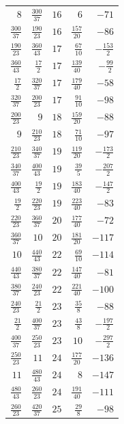 {\begin{longtable}{@{\extracolsep{\fill}}rrrrr}
$8$ & $\frac{300}{37}$ & $16$ & $6$ & $-71$ \\
$\frac{300}{37}$ & $\frac{190}{23}$ & $16$ & $\frac{157}{20}$ & $-86$ \\
$\frac{190}{23}$ & $\frac{360}{43}$ & $17$ & $\frac{67}{10}$ & $-\frac{153}{2}$ \\
$\frac{360}{43}$ & $\frac{17}{2}$ & $17$ & $\frac{139}{40}$ & $-\frac{99}{2}$ \\
$\frac{17}{2}$ & $\frac{320}{37}$ & $17$ & $\frac{179}{40}$ & $-58$ \\
$\frac{320}{37}$ & $\frac{200}{23}$ & $17$ & $\frac{91}{10}$ & $-98$ \\
$\frac{200}{23}$ & $9$ & $18$ & $\frac{159}{20}$ & $-88$ \\
$9$ & $\frac{210}{23}$ & $18$ & $\frac{71}{10}$ & $-97$ \\
$\frac{210}{23}$ & $\frac{340}{37}$ & $19$ & $\frac{119}{20}$ & $-\frac{173}{2}$ \\
$\frac{340}{37}$ & $\frac{400}{43}$ & $19$ & $\frac{39}{5}$ & $-\frac{207}{2}$ \\
$\frac{400}{43}$ & $\frac{19}{2}$ & $19$ & $\frac{183}{40}$ & $-\frac{147}{2}$ \\
$\frac{19}{2}$ & $\frac{220}{23}$ & $19$ & $\frac{223}{40}$ & $-83$ \\
$\frac{220}{23}$ & $\frac{360}{37}$ & $20$ & $\frac{177}{40}$ & $-72$ \\
$\frac{360}{37}$ & $10$ & $20$ & $\frac{181}{20}$ & $-117$ \\
$10$ & $\frac{440}{43}$ & $22$ & $\frac{69}{10}$ & $-114$ \\
$\frac{440}{43}$ & $\frac{380}{37}$ & $22$ & $\frac{147}{40}$ & $-81$ \\
$\frac{380}{37}$ & $\frac{240}{23}$ & $22$ & $\frac{221}{40}$ & $-100$ \\
$\frac{240}{23}$ & $\frac{21}{2}$ & $23$ & $\frac{35}{8}$ & $-88$ \\
$\frac{21}{2}$ & $\frac{400}{37}$ & $23$ & $\frac{43}{8}$ & $-\frac{197}{2}$ \\
$\frac{400}{37}$ & $\frac{250}{23}$ & $23$ & $10$ & $-\frac{297}{2}$ \\
$\frac{250}{23}$ & $11$ & $24$ & $\frac{177}{20}$ & $-136$ \\
$11$ & $\frac{480}{43}$ & $24$ & $8$ & $-147$ \\
$\frac{480}{43}$ & $\frac{260}{23}$ & $24$ & $\frac{191}{40}$ & $-111$ \\
$\frac{260}{23}$ & $\frac{420}{37}$ & $25$ & $\frac{29}{8}$ & $-98$ \\

\end{longtable}}
